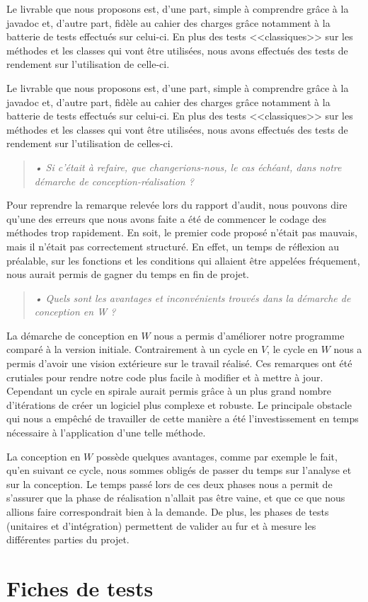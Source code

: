 \documentclass[12pt,a4paper]{report}
\begin{document}
Le livrable que nous proposons est, d'une part, simple à comprendre grâce à la javadoc et, d'autre part, fidèle au cahier des charges grâce notamment à la batterie de tests effectués sur celui-ci. En plus des tests <<classiques>> sur les méthodes et les classes qui vont être utilisées, nous avons effectués des tests de rendement sur l'utilisation de celle-ci. 

Le livrable que nous proposons est, d'une part, simple à comprendre grâce à la javadoc et, d'autre part, fidèle au cahier des charges grâce notamment à la batterie de tests effectués sur celui-ci. En plus des tests <<classiques>> sur les méthodes et les classes qui vont être utilisées, nous avons effectués des tests de rendement sur l'utilisation de celles-ci.


\begin{quotation}
\textit{• Si c'était à refaire, que changerions-nous, le cas échéant, dans notre démarche de conception-réalisation ?}
\end{quotation}

Pour reprendre la remarque relevée lors du rapport d'audit, nous pouvons dire qu'une des erreurs que nous avons faite a été de commencer le codage des méthodes trop rapidement. En soit, le premier code proposé n'était pas mauvais, mais il n'était pas correctement structuré. En effet, un temps de réflexion au préalable, sur les fonctions et les conditions qui allaient être appelées fréquement, nous aurait permis de gagner du temps en fin de projet. 

\begin{quotation}
\textit{• Quels sont les avantages et inconvénients trouvés dans la démarche de conception en W ?}
\end{quotation}


La démarche de conception en $W$ nous a permis d'améliorer notre programme comparé à la version initiale. Contrairement à un cycle en $V$, le cycle en $W$ nous a permis d'avoir une vision extérieure sur le travail réalisé. Ces remarques ont été crutiales pour rendre notre code plus facile à modifier et à mettre à jour. Cependant un cycle en spirale aurait permis grâce à un plus grand nombre d'itérations de créer un logiciel plus complexe et robuste. Le principale obstacle qui nous a empêché de travailler de cette manière a été l'investissement en temps nécessaire à l'application d'une telle méthode. 

La conception en $W$ possède quelques avantages, comme par exemple le fait, qu'en suivant ce cycle, nous sommes obligés de passer du temps sur l'analyse et sur la conception. Le temps passé lors de ces deux phases nous a permit de s'assurer que la phase de réalisation n'allait pas être vaine, et que ce que nous allions faire correspondrait bien à la demande. De plus, les phases de tests (unitaires et d'intégration) permettent de valider au fur et à mesure les différentes parties du projet.\\

\appendix
\chapter{Fiches de tests}
\end{document}
